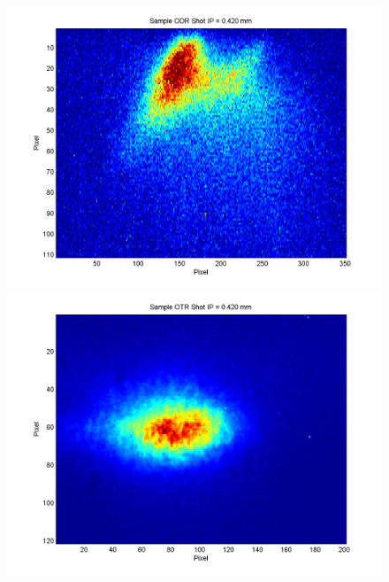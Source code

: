 \documentclass[12pt]{article}
\begin{document}
\begin{figure}
\begin{center}
\includegraphics[scale=0.5]{Figures/Sample_ODR_420.PNG}
\includegraphics[scale=0.5]{Figures/Sample_OTR_420.PNG}
\caption{}
\end{center}
\end{figure}
\end{document}
